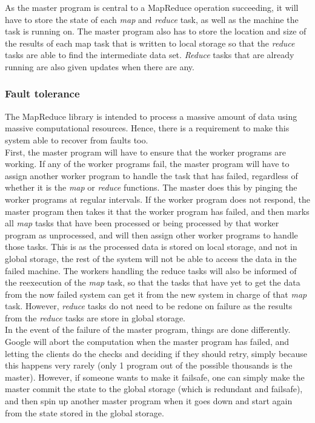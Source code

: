 \documentclass[]{article}
\begin{document}
As the master program is central to a MapReduce operation succeeding, it will have to store the state of each \emph{map} and \emph{reduce} task, as well as the machine the task is running on. The master program also has to store the location and size of the results of each map task that is written to local storage so that the \emph{reduce} tasks are able to find the intermediate data set. \emph{Reduce} tasks that are already running are also given updates when there are any. \\

\subsubsection{Fault tolerance}
The MapReduce library is intended to process a massive amount of data using massive computational resources. Hence, there is a requirement to make this system able to recover from faults too. \\

First, the master program will have to ensure that  the worker programs are working. If any of the worker programs fail, the master program will have to assign another worker program to handle the task that has failed, regardless of whether it is the \emph{map} or \emph{reduce} functions. The master does this by pinging the worker programs at regular intervals. If the worker program does not respond, the master program then takes it that the worker program has failed, and then marks all \emph{map} tasks that have been processed or being processed by that worker program as unprocessed, and will then assign other worker programs to handle those tasks. This is as the processed data is stored on local storage, and not in global storage, the rest of the system will not be able to access the data in the failed machine. The workers handling the reduce tasks will also be informed of the reexecution of the \emph{map} task, so that the tasks that have yet to get the data from the now failed system can get it from the new system in charge of that \emph{map} task. However, \emph{reduce} tasks do not need to be redone on failure as the results from the \emph{reduce} tasks are store in global storage.\\

In the event of the failure of the master program, things are done differently. Google will abort the computation when the master program has failed, and letting the clients do the checks and deciding if they should retry, simply because this happens very rarely (only 1 program out of the possible thousands is the master). However, if someone wants to make it failsafe, one can simply make the master commit the state to the global storage (which is redundant and failsafe), and then spin up another master program when it goes down and start again from the state stored in the global storage.\\
\end{document}
